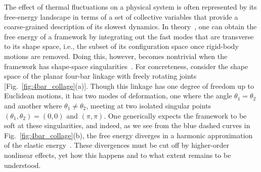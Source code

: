 The effect of thermal fluctuations on a physical system is often represented by its free-energy landscape in terms of a set of collective variables that provide a coarse-grained description of its slowest dynamics.
In theory~\cite{go1976,echenique2011}, one can obtain the free energy of a framework by integrating out the fast modes that are transverse to its shape space, i.e., the subset of its configuration space once rigid-body motions are removed.
Doing this, however, becomes nontrivial when the framework has shape-space singularities~\cite{zlatanov2002,liu2003,donelan2007}.
For concreteness, consider the shape space of the planar four-bar linkage with freely rotating joints~\cite{grashof1883,hartenberg1964,shimamoto2005} [Fig.~\ref{fig:4bar_collage}(a)].
Though this linkage has one degree of freedom up to Euclidean motions, it has two modes of deformation, one where the angle $\theta_1 = \theta_2$ and another where $\theta_1 \ne \theta_2$, meeting at two isolated singular points $(\theta_1,\theta_2) = (0,0)$ and $(\pi,\pi)$.
One generically expects the framework to be soft at these singularities, and indeed, as we see from the blue dashed curves in Fig.~\ref{fig:4bar_collage}(b), the free energy diverges in a harmonic approximation of the elastic energy~\cite{rocklin2018}.
These divergences must be cut off by higher-order nonlinear effects, yet how this happens and to what extent remains to be understood.

